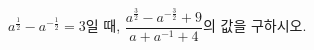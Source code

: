 $a^{\frac{1}{2}}-a^{-\frac{1}{2}}=3$일 때, $\dfrac{a^{\frac{3}{2}}-a^{-\frac{3}{2}}+9}{a+a^{-1}+4}$의 값을 구하시오. 
